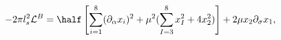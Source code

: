 \begin{equation}
- 2 \pi l_s^2 \mathcal{L}^B = \half \left[ \sum_{i=1}^8 (\partial_\alpha x_i)^2 +
 \mu^2 ( \sum_{I=3}^8 x_I^2 + 4 x_2^2 ) \right] + 2 \mu x_2 \partial_\sigma x_1,
\end{equation}

